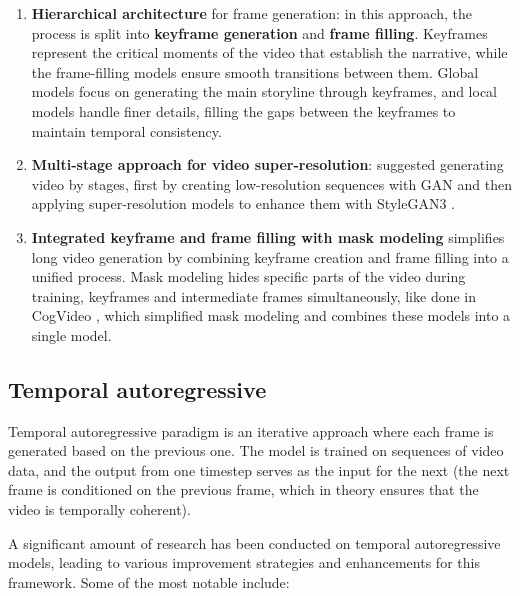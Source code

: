 \begin{enumerate}
    \item \textbf{Hierarchical architecture} for frame generation: in this approach, the process is split into \textbf{keyframe generation} and \textbf{frame filling}. Keyframes represent the critical moments of the video that establish the narrative, while the frame-filling models ensure smooth transitions between them. Global models focus on generating the main storyline through keyframes, and local models handle finer details, filling the gaps between the keyframes to maintain temporal consistency.
    \item \textbf{Multi-stage approach for video super-resolution}: \cite{brooks2022generating} suggested generating video by stages, first by creating low-resolution sequences with GAN and then applying super-resolution models to enhance them with StyleGAN3 \cite{stylegan3}.
    \item \textbf{Integrated keyframe and frame filling with mask modeling} simplifies long video generation by combining keyframe creation and frame filling into a unified process. Mask modeling hides specific parts of the video during training, keyframes and intermediate frames simultaneously, like done in CogVideo \cite{cogvideo}, which simplified mask modeling and combines these models into a single model.
\end{enumerate}

\subsection*{Temporal autoregressive}

Temporal autoregressive paradigm is an iterative approach where each frame is generated based on the previous one. The model is trained on sequences of video data, and the output from one timestep serves as the input for the next (the next frame is conditioned on the previous frame, which in theory ensures that the video is temporally coherent).

A significant amount of research has been conducted on temporal autoregressive models, leading to various improvement strategies and enhancements for this framework. Some of the most notable include:

